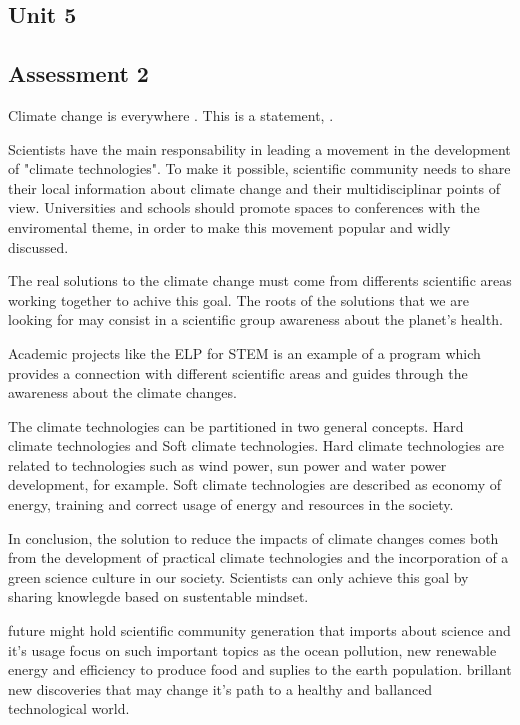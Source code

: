 \documentclass[11pt]{report}
\begin{document}
\begin{mainf} %
\chapter{Unit 5}
\section*{Assessment 2}
    Climate change is everywhere \cite{behrens_lemuridae_2016}.
    This is a statement, \cite{lake_white_1979}.
    
   
    Scientists have the main responsability in leading a movement in the development of "climate technologies". To make it possible, scientific community needs to share their local information about climate change and their multidisciplinar points of view. Universities and schools should promote spaces to conferences with the enviromental theme, in order to make this movement popular and widly discussed.

    The real solutions to the climate change must come from differents scientific areas working together to achive this goal.  The roots of the solutions that we are looking for may consist in a scientific group awareness about the planet's health.
     
    Academic projects like the ELP for STEM is an example of a program which provides a connection with different scientific areas and guides through the awareness about the climate changes.

    The climate technologies can be partitioned in two general concepts. Hard climate technologies and Soft climate technologies. Hard climate technologies are related to technologies such as wind power, sun power and water power development, for example. Soft climate technologies are described as economy of energy, training and correct usage of energy and resources in the society.

    In conclusion, the solution to reduce the impacts of climate changes comes both from the development of practical climate technologies and the incorporation of a green science culture in our society. Scientists can only achieve this goal by sharing knowlegde based on sustentable mindset.
    
    
    future might hold scientific community generation that imports about science and it's usage focus on such important topics as the ocean pollution, new renewable energy and efficiency to produce food and suplies to the earth population.
    brillant new discoveries that may change it's path to a healthy and ballanced technological world.


\end{mainf}
\end{document}

